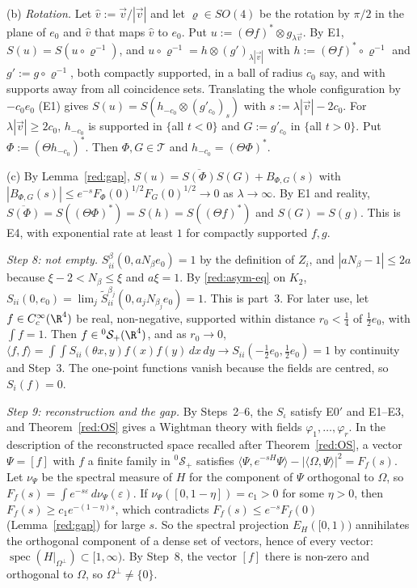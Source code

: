 (b) \emph{Rotation.} Let $\hat v:=\vec v/|\vec v|$ and let $\varrho\in SO(4)$ be the rotation by $\pi/2$ in the plane of $e_0$ and $\hat v$ that maps $\hat v$ to $e_0$. Put $u:=(\Theta f)^*\otimes g_{\lambda\vec v}$. By E1, $S(u)=S(u\circ\varrho^{-1})$, and $u\circ\varrho^{-1}=h\otimes(g')_{\lambda|\vec v|}$ with $h:=(\Theta f)^*\circ\varrho^{-1}$ and $g':=g\circ\varrho^{-1}$, both compactly supported, in a ball of radius $c_0$ say, and with supports away from all coincidence sets. Translating the whole configuration by $-c_0e_0$ (E1) gives $S(u)=S(h_{-c_0}\otimes(g'_{c_0})_{s})$ with $s:=\lambda|\vec v|-2c_0$. For $\lambda|\vec v|\ge2c_0$, $h_{-c_0}$ is supported in $\{$all $t<0\}$ and $G:=g'_{c_0}$ in $\{$all $t>0\}$. Put $\Phi:=(\Theta h_{-c_0})^*$. Then $\Phi,G\in\mathcal T$ and $h_{-c_0}=(\Theta\Phi)^*$.

(c) By Lemma~\ref{red:gap}, $S(u)=\overline{S(\Phi)}S(G)+B_{\Phi,G}(s)$ with $|B_{\Phi,G}(s)|\le e^{-s}F_\Phi(0)^{1/2}F_G(0)^{1/2}\to0$ as $\lambda\to\infty$. By E1 and reality, $\overline{S(\Phi)}=S((\Theta\Phi)^*)=S(h)=S((\Theta f)^*)$ and $S(G)=S(g)$. This is E4, with exponential rate at least $1$ for compactly supported $f,g$.

\emph{Step 8: not empty.} $S^\beta_{ii}(0,aN_\beta e_0)=1$ by the definition of $Z_i$, and $|aN_\beta-1|\le2a$ because $\xi-2<N_\beta\le\xi$ and $a\xi=1$. By \eqref{red:asym-eq} on $K_2$, $S_{ii}(0,e_0)=\lim_j\tilde S^{\beta_j}_{ii}(0,a_jN_{\beta_j}e_0)=1$. This is part~3. For later use, let $f\in C_c^\infty(\R^4)$ be real, non-negative, supported within distance $r_0<\tfrac14$ of $\tfrac12e_0$, with $\int f=1$. Then $f\in{}^0\mathcal S_+(\R^4)$, and as $r_0\to0$, $\langle f,f\rangle=\int\!\!\int S_{ii}(\theta x,y)f(x)f(y)\,dx\,dy\to S_{ii}(-\tfrac12e_0,\tfrac12e_0)=1$ by continuity and Step~3. The one-point functions vanish because the fields are centred, so $S_i(f)=0$.

\emph{Step 9: reconstruction and the gap.} By Steps~2--6, the $S_\iota$ satisfy E0$'$ and E1--E3, and Theorem~\ref{red:OS} gives a Wightman theory with fields $\varphi_1,\dots,\varphi_r$. In the description of the reconstructed space recalled after Theorem~\ref{red:OS}, a vector $\Psi=[f]$ with $f$ a finite family in ${}^0\mathcal S_+$ satisfies $\langle\Psi,e^{-sH}\Psi\rangle-|\langle\Omega,\Psi\rangle|^2=F_f(s)$. Let $\nu_\Psi$ be the spectral measure of $H$ for the component of $\Psi$ orthogonal to $\Omega$, so $F_f(s)=\int e^{-s\varepsilon}\,d\nu_\Psi(\varepsilon)$. If $\nu_\Psi([0,1-\eta])=c_1>0$ for some $\eta>0$, then $F_f(s)\ge c_1e^{-(1-\eta)s}$, which contradicts $F_f(s)\le e^{-s}F_f(0)$ (Lemma~\ref{red:gap}) for large $s$. So the spectral projection $E_H([0,1))$ annihilates the orthogonal component of a dense set of vectors, hence of every vector: $\operatorname{spec}(H|_{\Omega^\perp})\subset[1,\infty)$. By Step~8, the vector $[f]$ there is non-zero and orthogonal to $\Omega$, so $\Omega^\perp\ne\{0\}$.

